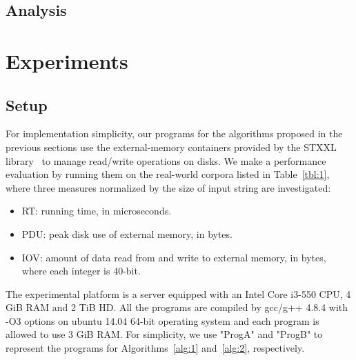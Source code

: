 \documentclass[10pt,journal,compsoc]{IEEEtran}
\begin{document}
\subsection{Analysis} \label{sec:method2:analysis}

{}

\section{Experiments} \label{sec:experiment}

\subsection{Setup} \label{sec:experiment:setup}

For implementation simplicity, our programs for the algorithms proposed in the previous sections use the external-memory containers provided by the STXXL library~\cite{Dementiev2007} to manage read/write operations on disks. We make a performance evaluation by running them on the real-world corpora listed in Table~\ref{tbl:1}, where three measures normalized by the size of input string are investigated:

\begin{itemize}
	
	\item RT: running time, in microseconds.
	
	\item PDU: peak disk use of external memory, in bytes.
	
	\item IOV: amount of data read from and write to external memory, in bytes, where each integer is 40-bit.
	
\end{itemize}

The experimental platform is a server equipped with an Intel Core i3-550 CPU, 4 GiB RAM and 2 TiB HD. All the programs are compiled by gcc/g++ 4.8.4 with -O3 options on ubuntu 14.04 64-bit operating system and each program is allowed to use 3 GiB RAM. For simplicity, we use "ProgA" and "ProgB" to represent the programs for Algorithms~\ref{alg:1} and~\ref{alg:2}, respectively.
\end{document}

